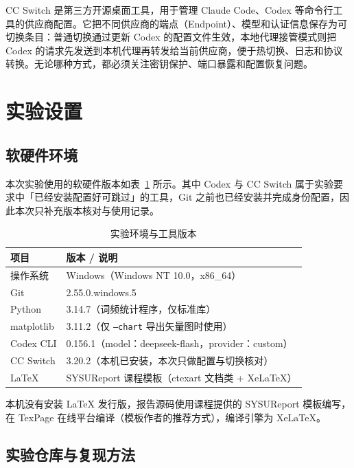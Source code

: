 \documentclass{SYSUReport}
\begin{document}
CC Switch 是第三方开源桌面工具，用于管理 Claude Code、Codex 等命令行工具的供应商配置。它把不同供应商的端点（Endpoint）、模型和认证信息保存为可切换条目：普通切换通过更新 Codex 的配置文件生效，本地代理接管模式则把 Codex 的请求先发送到本机代理再转发给当前供应商，便于热切换、日志和协议转换。无论哪种方式，都必须关注密钥保护、端口暴露和配置恢复问题。

\section{实验设置}

\subsection{软硬件环境}

本次实验使用的软硬件版本如表~\ref{tab:env} 所示。其中 Codex 与 CC Switch 属于实验要求中「已经安装配置好可跳过」的工具，Git 之前也已经安装并完成身份配置，因此本次只补充版本核对与使用记录。

\begin{table}[htbp]
    \centering
    \caption{实验环境与工具版本}
    \label{tab:env}
    \begin{tabular}{ll}
        \toprule
        项目 & 版本 / 说明 \\
        \midrule
        操作系统 & Windows（Windows NT 10.0，x86\_64） \\
        Git & 2.55.0.windows.5 \\
        Python & 3.14.7（词频统计程序，仅标准库） \\
        matplotlib & 3.11.2（仅 \texttt{--chart} 导出矢量图时使用） \\
        Codex CLI & 0.156.1（model：deepseek-flash，provider：custom） \\
        CC Switch & 3.20.2（本机已安装，本次只做配置与切换核对） \\
        LaTeX & SYSUReport 课程模板（ctexart 文档类 + XeLaTeX） \\
        \bottomrule
    \end{tabular}
\end{table}

本机没有安装 LaTeX 发行版，报告源码使用课程提供的 SYSUReport 模板编写，在 TexPage 在线平台编译（模板作者的推荐方式），编译引擎为 XeLaTeX。

\subsection{实验仓库与复现方法}
\end{document}
